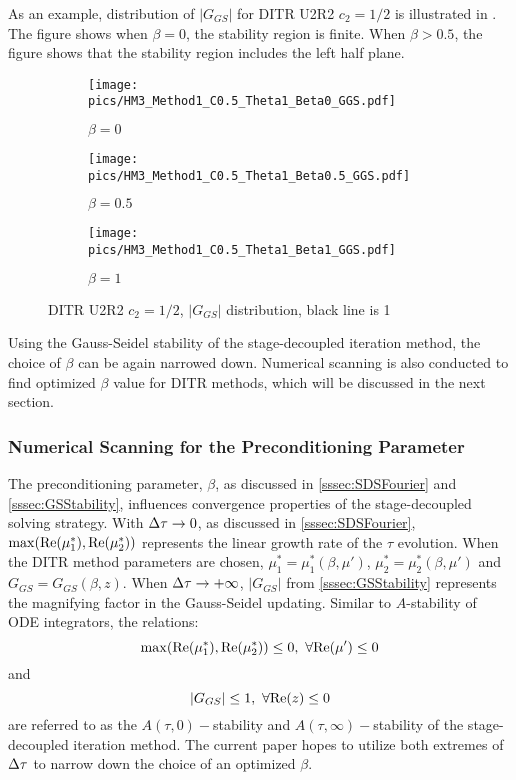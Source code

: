 As an example, distribution of $|G_{GS}|$ for DITR U2R2 $c_2=1/2$
is illustrated in .
The figure shows when $\beta=0$, the stability region is finite.
When $\beta>0.5$, the figure shows that the stability region includes
the left half plane.
\begin{figure}[htbp]
    \centering
    \begin{subfigure}{0.33\textwidth}
        \texttt{[image: pics/HM3\_Method1\_C0.5\_Theta1\_Beta0\_GGS.pdf]}
        \caption[]{$\beta = 0$}
    \end{subfigure}\hfill
    \begin{subfigure}{0.33\textwidth}
        \texttt{[image: pics/HM3\_Method1\_C0.5\_Theta1\_Beta0.5\_GGS.pdf]}
        \caption[]{$\beta = 0.5$}
    \end{subfigure}\hfill
    \begin{subfigure}{0.33\textwidth}
        \texttt{[image: pics/HM3\_Method1\_C0.5\_Theta1\_Beta1\_GGS.pdf]}
        \caption[]{$\beta = 1$}
    \end{subfigure}
    \caption{DITR U2R2 $c_2=1/2$, $|G_{GS}|$ distribution, black line is 1}
    \label{fig:GGSU2R2}
\end{figure}

Using the Gauss-Seidel stability of the stage-decoupled iteration method,
the choice of $\beta$ can be again narrowed down.
Numerical scanning is also conducted to find optimized $\beta$ value for
DITR methods, which will be discussed in the next section.

\subsubsection{Numerical Scanning for the Preconditioning Parameter}
\label{sssec:numScan}

The preconditioning parameter, $\beta$, as discussed in \ref{sssec:SDSFourier}
and \ref{sssec:GSStability}, influences convergence properties of the
stage-decoupled solving strategy.
With ${\Delta} \tau\rightarrow0$, as discussed in \ref{sssec:SDSFourier},
$\max(\mathrm{Re}(\mu^*_1),\mathrm{Re}(\mu^*_2))$ represents the linear growth
rate of the $\tau$ evolution.
When the DITR method parameters are chosen,
$\mu^*_1=\mu^*_1(\beta, \mu')$, $\mu^*_2=\mu^*_2(\beta, \mu')$ and $G_{GS}=G_{GS}(\beta, z)$.
When ${\Delta} \tau\rightarrow+\infty$, $|G_{GS}|$ from \ref{sssec:GSStability}
represents the magnifying factor in the Gauss-Seidel updating.
Similar to $A$-stability of ODE integrators,
the relations:
\begin{equation}
    \max(\real(\mu^*_1),\real(\mu^*_2)) \leq 0,\ \forall \real(\mu') \leq 0
\end{equation}
and
\begin{equation}
    |G_{GS}| \leq 1,\ \forall \mathrm{Re}(z) \leq 0
\end{equation}
are referred to as the $A(\tau,0)-$stability and
$A(\tau,\infty)-$stability
of the stage-decoupled iteration method.
The current paper hopes to utilize both extremes of ${\Delta}\tau$ to
narrow down the choice of an optimized $\beta$.


